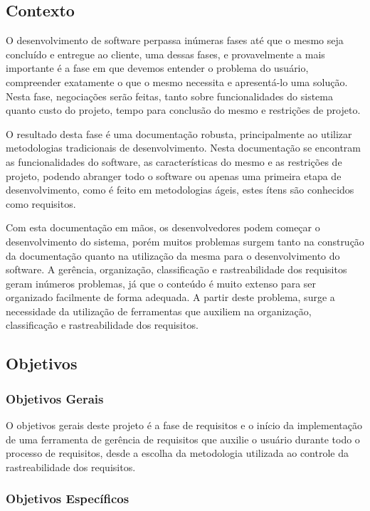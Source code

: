\subsection{Contexto} %
\label{sub:contexto}

O desenvolvimento de software perpassa inúmeras fases até que o mesmo seja concluído e entregue ao cliente, uma dessas fases, e provavelmente a mais importante é a fase em que devemos entender o problema do usuário, compreender exatamente o que o mesmo necessita e apresentá-lo uma solução. Nesta fase, negociações serão feitas, tanto sobre funcionalidades do sistema quanto custo do projeto, tempo para conclusão do mesmo e restrições de projeto.

O resultado desta fase é uma documentação robusta, principalmente ao utilizar metodologias tradicionais de desenvolvimento. Nesta documentação se encontram as funcionalidades do software, as características do mesmo e as restrições de projeto, podendo abranger todo o software ou apenas uma primeira etapa de desenvolvimento, como é feito em metodologias ágeis, estes ítens são conhecidos como requisitos.

Com esta documentação em mãos, os desenvolvedores podem começar o desenvolvimento do sistema, porém muitos problemas surgem tanto na construção da documentação quanto na utilização da mesma para o desenvolvimento do software. A gerência, organização, classificação e rastreabilidade dos requisitos geram inúmeros problemas, já que o conteúdo é muito extenso para ser organizado facilmente de forma adequada. A partir deste problema, surge a necessidade da utilização de ferramentas que auxiliem na organização, classificação e rastreabilidade dos requisitos.

\subsection{Objetivos} %
\label{sub:objetivos}
\subsubsection{Objetivos Gerais}

O objetivos gerais deste projeto é a fase de requisitos e o início da implementação de uma ferramenta de gerência de requisitos \opensource{} que auxilie o usuário durante todo o processo de requisitos, desde a escolha da metodologia utilizada ao controle da rastreabilidade dos requisitos.

\subsubsection{Objetivos Específicos}

